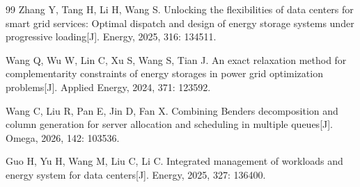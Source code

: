 \begin{thebibliography}{99}
Zhang Y, Tang H, Li H, Wang S. Unlocking the flexibilities of data centers for smart grid services: Optimal dispatch and design of energy storage systems under progressive loading[J]. Energy, 2025, 316: 134511.

Wang Q, Wu W, Lin C, Xu S, Wang S, Tian J. An exact relaxation method for complementarity constraints of energy storages in power grid optimization problems[J]. Applied Energy, 2024, 371: 123592.

Wang C, Liu R, Pan E, Jin D, Fan X. Combining Benders decomposition and column generation for server allocation and scheduling in multiple queues[J]. Omega, 2026, 142: 103536.

Guo H, Yu H, Wang M, Liu C, Li C. Integrated management of workloads and energy system for data centers[J]. Energy, 2025, 327: 136400.

\end{thebibliography}
\endgroup
